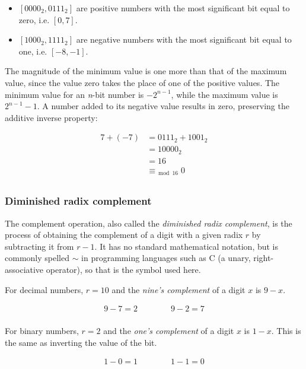\begin{itemize}
    \item
        $[0000_2, 0111_2]$ are positive numbers with the most significant bit
        equal to zero, i.e. $[0, 7]$.
    \item
        $[1000_2, 1111_2]$ are negative numbers with the most significant bit
        equal to one, i.e. $[-8, -1]$.
\end{itemize}

The magnitude of the minimum value is one more than that of the maximum value,
since the value zero takes the place of one of the positive values.  The minimum
value for an \textit{n}-bit number is $-2^{n - 1}$, while the maximum value is
$2^{n - 1} - 1$.  A number added to its negative value results in zero,
preserving the additive inverse property:

\begin{align*}
    7 + (-7) & = 0111_2 + 1001_2 \\
             & = 10000_2 \\
             & = 16 \\
             & \equiv_{\bmod{16}} 0 \\
\end{align*}

\subsubsection{Diminished radix complement}

The complement operation, also called the \textit{diminished radix complement},
is the process of obtaining the complement of a digit with a given radix $r$ by
subtracting it from $r - 1$.  It has no standard mathematical notation, but is
commonly spelled $\sim$ in programming languages such as C (a unary,
right-associative operator), so that is the symbol used here.

For decimal numbers, $r = 10$ and the \textit{nine's complement} of a digit $x$
is $9 - x$.

\begin{align*}
    9 - 7 = 2 \qquad \qquad 9 - 2 = 7 \\
\end{align*}

For binary numbers, $r = 2$ and the \textit{one's complement} of a digit $x$ is
$1 - x$.  This is the same as inverting the value of the bit.

\begin{align*}
    1 - 0 = 1 \qquad \qquad 1 - 1 = 0 \\
\end{align*}

